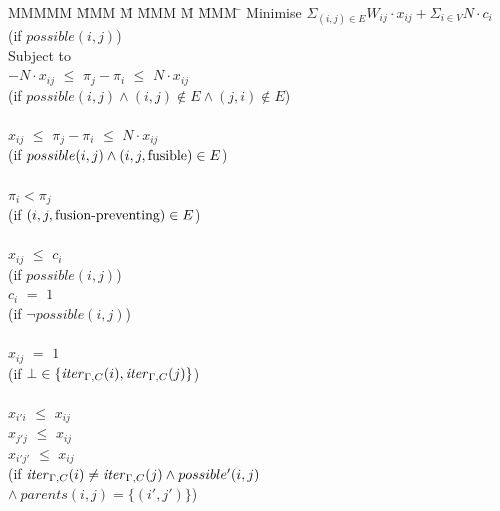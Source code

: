\begin{tabbing}
MMMMM   \= MMM \= M \= MMM \= M \= MMM \= \kill
Minimise   \> $\Sigma_{(i,j) \in E} W_{ij} \cdot x_{ij} + \Sigma_{i \in V} N \cdot c_i$  \\
           \> (if $possible(i,j)$)         \\
Subject to \\
           \> $-N \cdot x_{ij}$ \> $\le$ \> $\pi_j - \pi_i$ \> $\le$ \> $N \cdot x_{ij}$ \\
           \> (if $possible(i,j) \wedge (i,j) \not\in E \wedge (j,i) \not\in E$)            \\
\\
           \>    $x_{ij}$ \> $\le$ \> $\pi_j - \pi_i$ \> $\le$ \> $N \cdot x_{ij}$ \\
           \> (if $possible(i,j) \wedge (i,j,\mathrm{fusible}) \in E$)     \\
\\
           \>             \>       \> $\pi_i < \pi_j$ \>       \>            \\
           \> (if $(i,j,\mbox{fusion-preventing}) \in E$)    \\
\\
           \> $x_{ij}$    \> $\le$ \> $c_i$           \>       \>            \\
           \> (if $possible(i,j)$) \\
           \> $c_{i }$    \> $ = $ \> $ 1 $           \>       \>            \\
           \> (if $\neg possible(i,j)$) \\
           \\
           \> $x_{ij}$    \> $=$   \> $1$             \>       \>            \\
           \> (if $\bot \in \{\mathit{iter}_{\Gamma,C}(i), \mathit{iter}_{\Gamma,C}(j)\}$)  \\
           \\
           \> $x_{i'i}$   \> $\le$ \> $x_{ij}$        \>       \>            \\
           \> $x_{j'j}$   \> $\le$ \> $x_{ij}$        \>       \>            \\
           \> $x_{i'j'}$   \> $\le$ \> $x_{ij}$        \>       \>            \\
           \> (if $\mathit{iter}_{\Gamma,C}(i) \not= \mathit{iter}_{\Gamma,C}(j) \wedge possible'(i,j)$ \\
           \> \> $\wedge~parents(i,j) = \{(i',j')\}$) \\


\end{tabbing}
